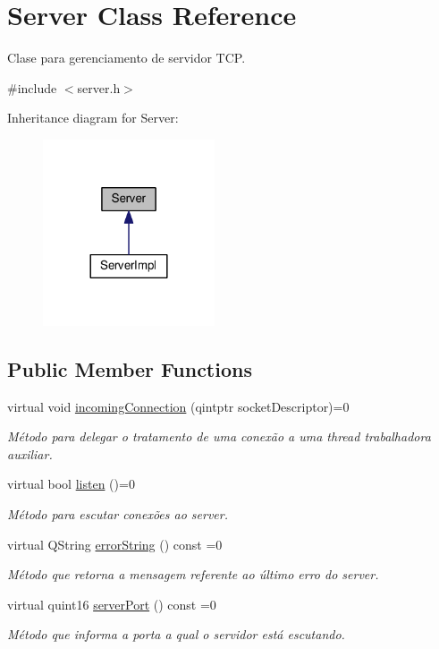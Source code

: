 \hypertarget{classServer}{}\section{Server Class Reference}
\label{classServer}


Clase para gerenciamento de servidor T\+CP.  




{\ttfamily \#include $<$server.\+h$>$}



Inheritance diagram for Server\+:
\nopagebreak
\begin{figure}[H]
\begin{center}
\leavevmode
\includegraphics[width=144pt]{d3/dd7/classServer__inherit__graph}
\end{center}
\end{figure}
\subsection*{Public Member Functions}
\begin{DoxyCompactItemize}
\item 
virtual void \hyperlink{classServer_a2397527620515d7e18fc599b22fb64ae}{incoming\+Connection} (qintptr socket\+Descriptor)=0
\begin{DoxyCompactList}\small\item\em Método para delegar o tratamento de uma conexão a uma thread trabalhadora auxiliar. \end{DoxyCompactList}\item 
virtual bool \hyperlink{classServer_a2393cde56bb44076cbfba00c89412acf}{listen} ()=0
\begin{DoxyCompactList}\small\item\em Método para escutar conexões ao server. \end{DoxyCompactList}\item 
virtual Q\+String \hyperlink{classServer_a66eb77ac2362bdae05081591389c3cf5}{error\+String} () const =0
\begin{DoxyCompactList}\small\item\em Método que retorna a mensagem referente ao último erro do server. \end{DoxyCompactList}\item 
virtual quint16 \hyperlink{classServer_ad32766e2608017d9fcd0903ab3748803}{server\+Port} () const =0
\begin{DoxyCompactList}\small\item\em Método que informa a porta a qual o servidor está escutando. \end{DoxyCompactList}\end{DoxyCompactItemize}


